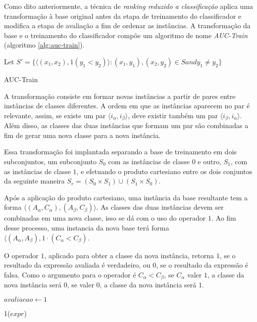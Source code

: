 Como dito anteriormente, a técnica de \emph{ranking reduzido a classificação} aplica uma transformação à base original antes da etapa de treinamento do classificador e modifica a etapa de avaliação a fim de ordenar as instâncias. A transformação da base e o treinamento do classificador compõe um algoritmo de nome \emph{AUC-Train} (algoritmo \ref{alg:auc-train}).

\begin{algorithm}
    Let $S' = \{\langle (x_1, x_2), 1(y_1 < y_2) \rangle : (x_1, y_1), (x_2, y_2) \in S and y_1 \neq y_2\}$\;
    
    \caption{AUC-Train}
    \label{alg:auc-train}
\end{algorithm}

A transformação consiste em formar novas instâncias a partir de pares entre instâncias de classes diferentes. A ordem em que as instâncias aparecem no par é relevante, assim, se existe um par $\langle i_\alpha, i_\beta \rangle$, deve existir também um par $\langle i_\beta, i_\alpha \rangle$. Além disso, as classes das duas instâncias que formam um par são combinadas a fim de gerar uma nova classe para a nova instância.

Essa transformação foi implantada separando a base de treinamento em dois subconjuntos, um subconjunto $S_0$ com as instâncias de classe $0$ e outro, $S_1$, com as instâncias de classe $1$, e efetuando o produto cartesiano entre os dois conjuntos da seguinte maneira $S_r = (S_0 \times S_1) \cup (S_1 \times S_0)$.

Após a aplicação do produto cartesiano, uma instância da base resultante tem a forma $\langle (A_\alpha, C_\alpha), (A_\beta, C_\beta) \rangle$. As classes das duas instâncias devem ser combinadas em uma nova classe, isso se dá com o uso do operador $1$. Ao fim desse processo, uma instancia da nova base terá forma $\langle (A_\alpha, A_\beta), 1 \cdot (C_\alpha < C_\beta)$.

O operador $1$, aplicado para obter a classe da nova instância, retorna $1$, se o resultado da expressão avaliada é verdadeiro, ou $0$, se o resultado da expressão é falsa. Como o argumento para o operador é $C_\alpha < C_\beta$, se $C_\alpha$ valer $1$, a classe da nova instância será $0$, se valer $0$, a classe da nova instância será $1$.


\begin{function}
    $avaliacao \gets 1$



    \caption{1($expr$)}
    \label{alg:one}
\end{function}

